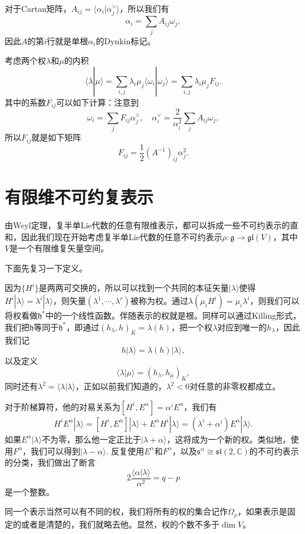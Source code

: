 \documentclass[9pt]{extarticle}
\newcommand{\cc}{\mathbb{C}}
\newcommand{\lag}{{\mathfrak{g}}}
\begin{document}
对于Cartan矩阵，$A_{ij}=\langle \alpha_i|\alpha^\vee_j\rangle$，所以我们有
\[
	\alpha_i=\sum_j A_{ij}\omega_j,
\]
因此$A$的第$i$行就是单根$\alpha_i$的Dynkin标记。

\para 考虑两个权$\lambda$和$\mu$的内积
\[
	\langle \lambda|\mu\rangle=\sum_{i,j}\lambda_i\mu_j\langle \omega_i|\omega_j\rangle=\sum_{i,j}\lambda_i\mu_j F_{ij}.
\]
其中的系数$F_{ij}$可以如下计算：注意到
\[
	\omega_i=\sum_j F_{ij} \alpha_j^\vee,\quad \alpha_i^\vee=\frac{2}{\alpha_i^2}\sum_j A_{ij}\omega_j,
\]
所以$F_{ij}$就是如下矩阵
\[
	F_{ij}=\frac{1}{2}(A^{-1})_{ij}\alpha_j^2.
\]

\section{有限维不可约复表示}

由Weyl定理，复半单Lie代数的任意有限维表示，都可以拆成一些不可约表示的直和，因此我们现在开始考虑复半单Lie代数的任意不可约表示$\rho:\lag\to \mathfrak{gl}(V)$，其中$V$是一个有限维复矢量空间。

下面先复习一下定义。

\para 因为$\{H^i\}$是两两可交换的，所以可以找到一个共同的本征矢量$|\lambda\rangle$使得$H^i|\lambda\rangle=\lambda^i|\lambda\rangle$，则矢量$(\lambda^1,\cdots,\lambda^r)$被称为权。通过$\lambda(\mu_iH^i)=\mu_i\lambda^i$，则我们可以将权看做$\mathfrak{h}^*$中的一个线性函数。伴随表示的权就是根。同样可以通过Killing形式，我们把$\mathfrak{h}$等同于$\mathfrak{h}^*$，即通过$(h_\lambda,h)_K=\lambda(h)$，把一个权$\lambda$对应到唯一的$h_\lambda$，因此我们记
\[
	h|\lambda\rangle=\lambda(h)|\lambda\rangle,
\]
以及定义
\[
	\langle \lambda|\mu\rangle=(h_\lambda,h_\mu)_K,
\]
同时还有$\lambda^2=\langle \lambda|\lambda\rangle$，正如以前我们知道的，$\lambda^2<0$对任意的非零权都成立。

对于阶梯算符，他的对易关系为$[H^i,E^\alpha]=\alpha^iE^\alpha$，我们有
\[
	H^iE^\alpha|\lambda\rangle=[H^i,E^\alpha]|\lambda\rangle+E^\alpha H^i|\lambda\rangle=(\lambda^i+\alpha^i)E^\alpha |\lambda\rangle.
\]
如果$E^\alpha |\lambda\rangle$不为零，那么他一定正比于$|\lambda+\alpha\rangle$，这将成为一个新的权。类似地，使用$F^\alpha$，我们可以得到$|\lambda-\alpha\rangle$. 反复使用$E^\alpha$和$F^\alpha$，以及$\mathfrak{s}^\alpha\cong \mathfrak{sl}(2,\cc)$的不可约表示的分类，我们做出了断言
\[
	2\frac{\langle\alpha|\lambda\rangle}{\alpha^2}=q-p
\]
是一个整数。

同一个表示当然可以有不同的权，我们将所有的权的集合记作$\Omega_\rho$，如果表示是固定的或者是清楚的，我们就略去他。显然，权的个数不多于$\dim V$。
\end{document}
